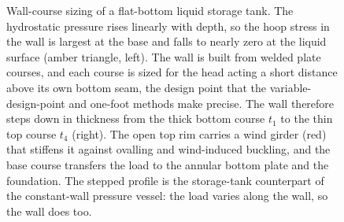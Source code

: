 \begin{figure}[htbp]
\caption[Shell-course thickness of a flat-bottom storage tank]{Wall-course
sizing of a flat-bottom liquid storage tank. The hydrostatic pressure rises
linearly with depth, so the hoop stress in the wall is largest at the base
and falls to nearly zero at the liquid surface (amber triangle, left). The
wall is built from welded plate courses, and each course is sized for the
head acting a short distance above its own bottom seam, the design point
that the variable-design-point and one-foot methods make precise. The wall
therefore steps down in thickness from the thick bottom course $t_1$ to the
thin top course $t_4$ (right). The open top rim carries a wind girder (red)
that stiffens it against ovalling and wind-induced buckling, and the base
course transfers the load to the annular bottom plate and the foundation.
The stepped profile is the storage-tank counterpart of the constant-wall
pressure vessel: the load varies along the wall, so the wall does too.}
\label{fig:vol03ch09:tank-courses}
\end{figure}
